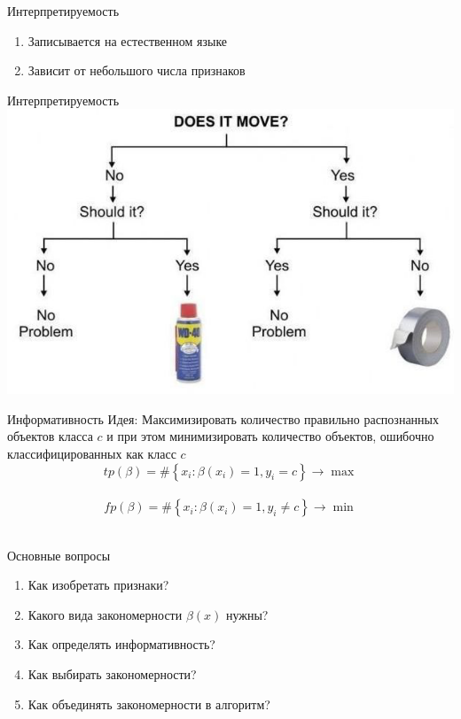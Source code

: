 \documentclass[10pt]{beamer}
\begin{document}
\begin{frame}{Интерпретируемость}
	\begin{enumerate}
		\item Записывается на естественном языке
		\item Зависит от небольшого числа признаков
	\end{enumerate}
\end{frame}

\begin{frame}{Интерпретируемость}
    \centering
	\includegraphics[width=\textwidth, height=0.8 \textheight, keepaspectratio]{images/decisiontree}
\end{frame}

\begin{frame}{Информативность}
  \alert{Идея}: Максимизировать количество правильно распознанных объектов класса $c$ и при этом минимизировать количество объектов, ошибочно классифицированных как класс $c$
  \pause
	\bigbreak
	$${ tp(\beta) = \# \left\{ x_i: \beta(x_i) = 1 , y_i = c \right\} \rightarrow \max }$$\\
	\pause
  \bigbreak
	$${ fp(\beta) = \# \left\{ x_i: \beta(x_i) = 1 , y_i \neq c \right\} \rightarrow \min }$$\\		
\end{frame}

\begin{frame}{Основные вопросы}
	\begin{enumerate}
		\item Как изобретать признаки? 
		\item Какого вида закономерности $\beta(x)$ нужны?
		\item Как определять информативность? 
		\item Как выбирать закономерности?
		\item Как объединять закономерности в алгоритм?
	\end{enumerate}
\end{frame}
\end{document}
